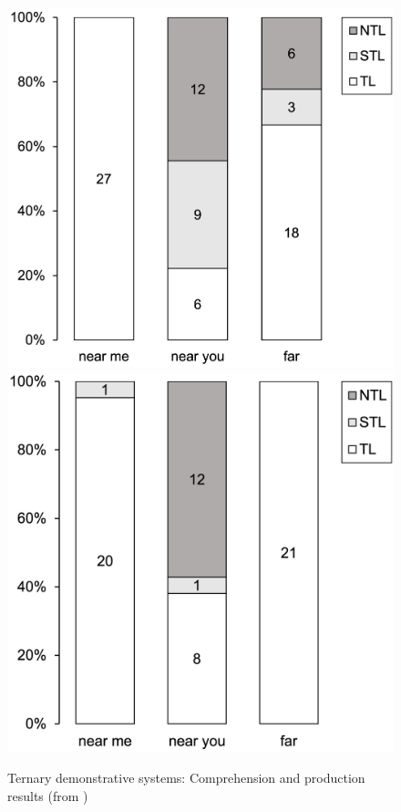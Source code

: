 \documentclass[output=paper]{langscibook}
\begin{document}
\begin{figure}
\includegraphics[height=.3\textheight]{figures/overviewAna}\hfill\includegraphics[height=.3\textheight]{figures/overviewBna}
\caption{Ternary demonstrative systems: Comprehension and production results (from \citealt[9]{Terenghi2022Ls})}
\label{fig:dems}
\end{figure}
\end{document}
